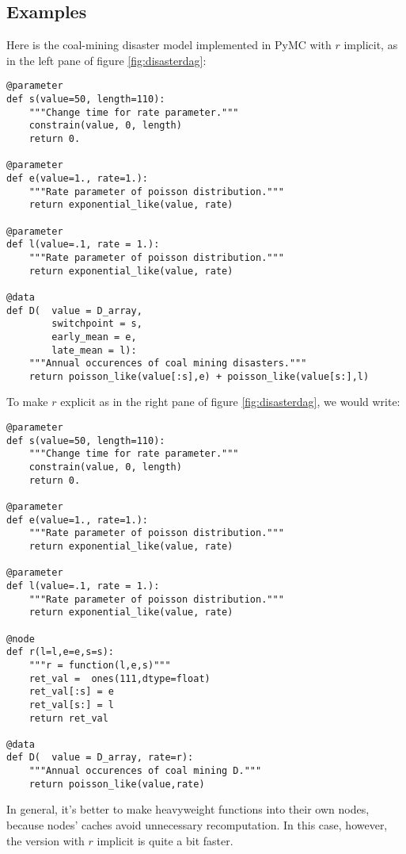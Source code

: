\subsection{Examples}\label{sub:example}
Here is the coal-mining disaster model implemented in PyMC with $r$ implicit, as in the left pane of figure \ref{fig:disasterdag}:
\begin{verbatim}
@parameter
def s(value=50, length=110):
    """Change time for rate parameter."""
    constrain(value, 0, length)
    return 0.

@parameter
def e(value=1., rate=1.):
    """Rate parameter of poisson distribution."""
    return exponential_like(value, rate)

@parameter
def l(value=.1, rate = 1.):
    """Rate parameter of poisson distribution."""
    return exponential_like(value, rate)

@data
def D(  value = D_array,
        switchpoint = s,
        early_mean = e,
        late_mean = l):
    """Annual occurences of coal mining disasters."""
    return poisson_like(value[:s],e) + poisson_like(value[s:],l)
\end{verbatim}
To make $r$ explicit as in the right pane of figure \ref{fig:disasterdag}, we would write:
\begin{verbatim}
@parameter
def s(value=50, length=110):
    """Change time for rate parameter."""
    constrain(value, 0, length)
    return 0.

@parameter
def e(value=1., rate=1.):
    """Rate parameter of poisson distribution."""
    return exponential_like(value, rate)

@parameter
def l(value=.1, rate = 1.):
    """Rate parameter of poisson distribution."""
    return exponential_like(value, rate)

@node
def r(l=l,e=e,s=s):
    """r = function(l,e,s)"""
    ret_val =  ones(111,dtype=float)
    ret_val[:s] = e
    ret_val[s:] = l
    return ret_val

@data
def D(  value = D_array, rate=r):
    """Annual occurences of coal mining D."""
    return poisson_like(value,rate)
\end{verbatim}
In general, it's better to make heavyweight functions into their own nodes, because nodes' caches avoid unnecessary recomputation. In this case, however, the version with $r$ implicit is quite a bit faster.